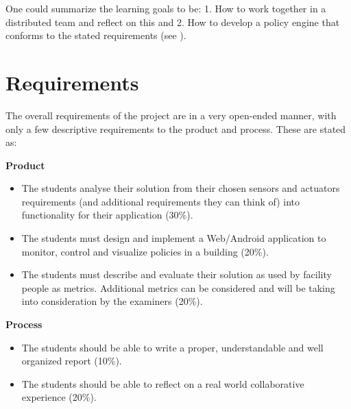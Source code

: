 One could summarize the learning goals to be: 1. How to work together in a distributed team and reflect on this and 2. How to develop a policy engine that conforms to the stated requirements (see ).

\section{Requirements} \label{sec:requirements}
The overall requirements of the project are in a very open-ended manner, with only a few descriptive requirements to the product and process. These are stated as:

\textbf{Product}
\begin{itemize}
	\item The students analyse their solution from their chosen sensors and actuators requirements (and additional requirements they can think of) into functionality for their application (30\%).
	\item The students must design and implement a Web/Android application to monitor, control and visualize policies in a building (20\%).
	\item The students must describe and evaluate their solution as used by facility people as metrics. Additional metrics can be considered and will be taking into consideration by the examiners (20\%).
\end{itemize}

\textbf{Process}
\begin{itemize}
	\item The students should be able to write a proper, understandable and well organized report (10\%).
	\item The students should be able to reflect on a real world collaborative experience (20\%).
\end{itemize}


